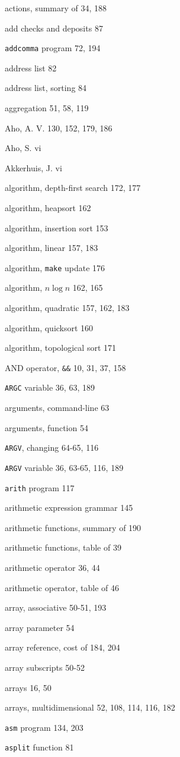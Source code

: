 \begin{multicols}{3}
actions, summary of 34, 188 

add checks and deposits 87 

\verb'addcomma' program 72, 194

address list 82 

address list, sorting 84

aggregation 51, 58, 119

Aho, A. V. 130, 152, 179, 186

Aho, S. vi 

Akkerhuis, J. vi 

algorithm, depth-first search 172, 177

algorithm, heapsort 162

algorithm, insertion sort 153

algorithm, linear 157, 183

algorithm, \verb'make' update 176

algorithm, $n\log n$ 162, 165

algorithm, quadratic 157, 162, 183

algorithm, quicksort 160

algorithm, topological sort 171

AND operator, \verb'&&' 10, 31, 37, 158

\verb'ARGC' variable 36, 63, 189

arguments, command-line 63

arguments, function 54

\verb'ARGV', changing 64-65, 116

\verb'ARGV' variable 36, 63-65, 116, 189

\verb'arith' program 117

arithmetic expression grammar 145

arithmetic functions, summary of 190

arithmetic functions, table of 39

arithmetic operator 36, 44

arithmetic operator, table of 46

array, associative 50-51, 193

array parameter 54

array reference, cost of 184, 204

array subscripts 50-52

arrays 16, 50

arrays, multidimensional 52, 108, 114, 116, 182

\verb'asm' program 134, 203

\verb'asplit' function 81


\end{multicols}
